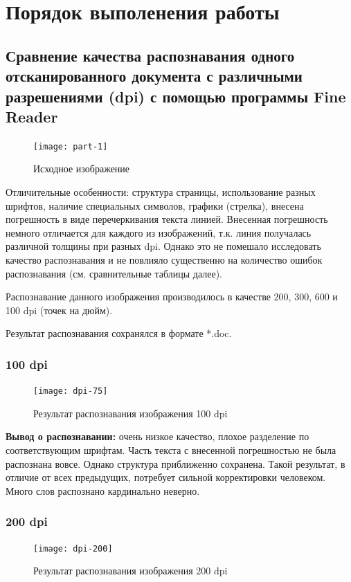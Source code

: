 	\section{Порядок выполенения работы}
		\subsection{Сравнение качества распознавания одного отсканированного документа с различными разрешениями (dpi) с помощью программы Fine Reader}
			
			\begin{figure}[h]
				\centering
				\texttt{[image: part-1]}
				\caption{Исходное изображение}
				\label{fig:part-1}
			\end{figure}
			
		Отличительные особенности: структура страницы, использование разных шрифтов, наличие специальных символов, графики (стрелка), внесена погрешность в виде перечеркивания текста линией. Внесенная погрешность немного отличается для каждого из изображений, т.к. линия получалась различной толщины при разных dpi. Однако это не помешало исследовать качество распознавания и не повлияло существенно на количество ошибок распознавания (см. сравнительные таблицы далее).
		
		Распознавание данного изображения производилось в качестве 200, 300, 600  и 100 dpi (точек на дюйм).
		
		Результат распознавания сохранялся в формате *.doc.
		
		\subsubsection{100 dpi}
			
			\begin{figure}[h]
				\centering
				\texttt{[image: dpi-75]}
				\caption{Результат распознавания изображения 100 dpi}
				\label{fig:dpi-75}
			\end{figure}
		
		\textbf{Вывод о распознавании:} очень низкое качество, плохое разделение по соответствующим шрифтам. Часть текста с внесенной погрешностью не была распознана вовсе. Однако структура приближенно сохранена. Такой результат, в отличие от всех предыдущих, потребует сильной корректировки человеком. Много слов распознано кардинально неверно.
		
		\subsubsection{200 dpi}
			\begin{figure}[h]
				\centering
				\texttt{[image: dpi-200]}
				\caption{Результат распознавания изображения 200 dpi}
				\label{fig:dpi-75}
			\end{figure}
		
